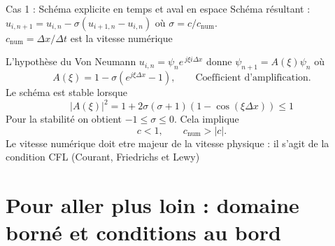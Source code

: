 \documentclass[aspectratio=169, french]{beamer}
\begin{document}
\begin{frame}{Cas 1 : Schéma explicite en temps et aval en espace}
Schéma résultant : 
$u_{i, n+1} = u_{i, n} - \sigma(u_{i+1, n} - u_{i, n})$ où $\sigma = c/c_{\mathrm{num}}$.\\
 $c_{\mathrm{num}} = \Delta x/\Delta t$ est la vitesse numérique

\begin{tcolorbox}
L'hypothèse du Von Neumann $u_{i, n} = \psi_n e^{\, j  \xi  i  \Delta x}$ donne $\psi_{n+1} = A(\xi) \psi_n$ où
\begin{equation*}
	A(\xi) = 1 - \sigma(e^{j  \xi \Delta x}-1), \qquad \text{Coefficient d'amplification}.
\end{equation*}
Le schéma est stable lorsque
\begin{equation*}
	|A(\xi)|^2 = 1 + 2 \sigma(\sigma + 1)(1 - \cos(\xi \Delta x))\le 1
\end{equation*}
Pour la stabilité on obtient $-1 \le \sigma \le 0$. Cela implique
\begin{equation*}
	c<1, \qquad c_{\mathrm{num}}> |c|.
\end{equation*}
Le vitesse numérique doit etre majeur de la vitesse physique : il s'agit de la condition CFL (Courant, Friedrichs et Lewy)
\end{tcolorbox}

\end{frame}


\section{Pour aller plus loin : domaine borné et conditions au bord}
\end{document}
